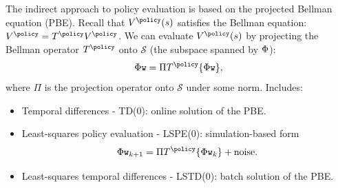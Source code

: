 The indirect approach to policy evaluation is based on the projected Bellman equation (PBE). Recall that $V^\policy(s)$ satisfies the Bellman equation: $V^\policy = T^\policy V^\policy$. We can evaluate $V^\policy(s)$ by projecting the Bellman operator $T^\policy$ onto $\mathcal{S}$ (the subspace spanned by $\Phi$):
\begin{equation*}
    \FtrMtx \weights = \Pi T^\policy \{\FtrMtx \weights\},
\end{equation*}
where $\Pi$ is the projection operator onto $\mathcal{S}$ under some norm.
Includes:
\begin{itemize}
\item Temporal differences - TD(0): online solution of the PBE.
\item Least-squares policy evaluation - LSPE(0): simulation-based form
\begin{align*}\FtrMtx \weights_{k+1} = \Pi T^\policy \{\FtrMtx \weights_k\} + \mathrm{noise}.\end{align*} 
\item Least-squares temporal differences - LSTD(0): batch solution of the PBE.
\end{itemize}

